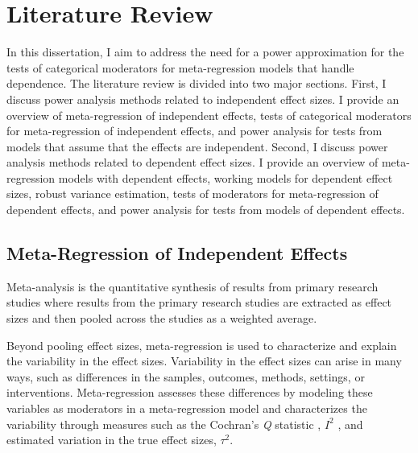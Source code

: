 \chapter{Literature Review}\label{ch:literaturereview}


In this dissertation, I aim to address the need for a power approximation for the tests of categorical moderators for meta-regression models that handle dependence. The literature review is divided into two major sections. First, I discuss power analysis methods related to independent effect sizes. I provide an overview of meta-regression of independent effects, tests of categorical moderators for meta-regression of independent effects, and power analysis for tests from models that assume that the effects are independent. Second, I discuss power analysis methods related to dependent effect sizes. I provide an overview of meta-regression models with dependent effects, working models for dependent effect sizes, robust variance estimation, tests of moderators for meta-regression of dependent effects, and power analysis for tests from models of dependent effects. 

\section{Meta-Regression of Independent Effects}
Meta-analysis is the quantitative synthesis of results from primary research studies where results from the primary research studies are extracted as effect sizes \autocite[e.g., standardized mean differences, correlation, odds ratio, etc.;][]{cooper2019} and then pooled across the studies as a weighted average. 


Beyond pooling effect sizes, meta-regression is used to characterize and explain the variability in the effect sizes. Variability in the effect sizes can arise in many ways, such as differences in the samples, outcomes, methods, settings, or interventions. Meta-regression assesses these differences by modeling these variables as moderators in a meta-regression model and characterizes the variability through measures such as the Cochran's \emph{Q} statistic \autocite{cochran1954,cooper2019}, $I^2$ \autocite{higgins2002}, and estimated variation in the true effect sizes, $\tau^2$. 

